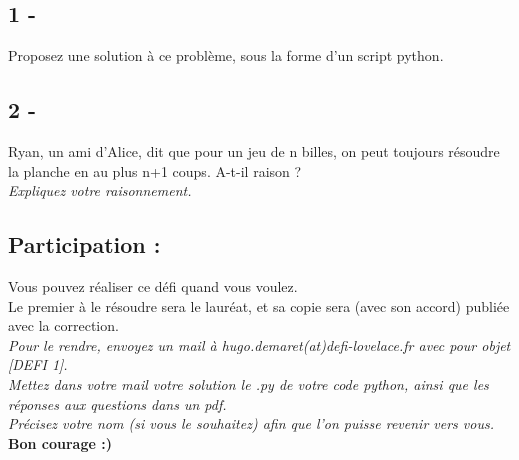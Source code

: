 \documentclass{article}
\begin{document}
        \subsection*{1 -}
            \textsf{Proposez une solution à ce problème, sous la forme d'un script python.}\\
        \subsection*{2 -}
            \textsf{Ryan, un ami d'Alice, dit que pour un jeu de n billes, on peut toujours résoudre la planche en au plus n+1 coups. A-t-il raison ?}\\
            \textit{Expliquez votre raisonnement.}
        \subsection*{Participation :}
            \textsf{Vous pouvez réaliser ce défi quand vous voulez.}\\
            \textsf{Le premier à le résoudre sera le lauréat, et sa copie sera (avec son accord) publiée avec la correction.}\\
            \textit{Pour le rendre, envoyez un mail à hugo.demaret(at)defi-lovelace.fr avec pour objet [DEFI 1]. \\ Mettez dans votre mail votre solution le .py de votre code python, ainsi que les réponses aux questions dans un pdf.}\\
            \textit{Précisez votre nom (si vous le souhaitez) afin que l'on puisse revenir vers vous.}
            \textbf{Bon courage :)}
\end{document}

